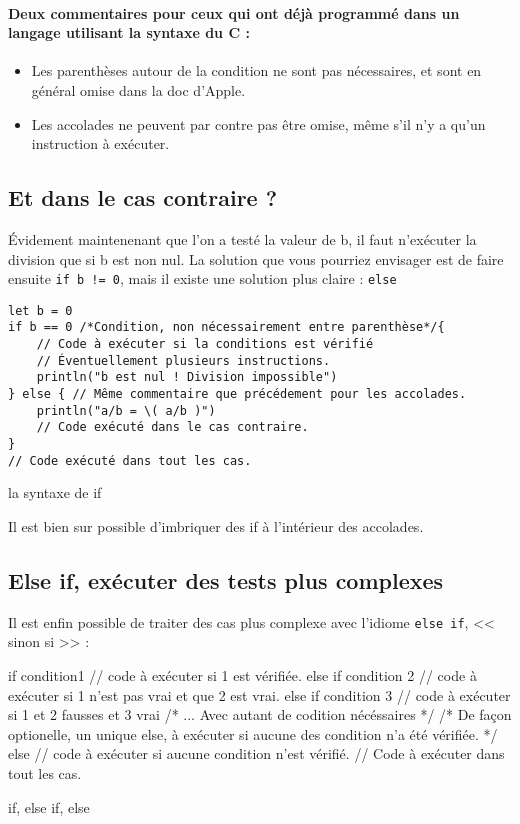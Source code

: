 \paragraph{Deux commentaires pour ceux qui ont déjà programmé
dans un langage utilisant la syntaxe du C :}
\begin{itemize}
\item Les parenthèses autour de la condition ne sont pas nécessaires,
et sont en général omise dans la doc d'Apple.
\item Les accolades ne peuvent par contre pas être omise,
même s'il n'y a qu'un instruction à exécuter.
\end{itemize}
\subsection{Et dans le cas contraire ?}
Évidement maintenenant que l'on  a testé la valeur de b, il faut n'exécuter la division que si b est non nul.
La solution que vous pourriez envisager est de faire ensuite
\texttt{if b != 0},
mais il existe une solution plus claire : \texttt{else}
\begin{listing}[h]
\begin{verbatim}
let b = 0
if b == 0 /*Condition, non nécessairement entre parenthèse*/{
    // Code à exécuter si la conditions est vérifié
    // Éventuellement plusieurs instructions.
    println("b est nul ! Division impossible")
} else { // Même commentaire que précédement pour les accolades.
    println("a/b = \( a/b )")
    // Code exécuté dans le cas contraire.
}
// Code exécuté dans tout les cas.
\end{verbatim}
\caption{la syntaxe de if}
\end{listing} %

Il est bien sur possible d'imbriquer des if à l'intérieur des accolades.
\subsection{Else if, exécuter des tests plus complexes}
Il est enfin possible de traiter des cas plus complexe avec l'idiome \texttt{else if}, << sinon si >> :
\begin{listing}[h]
if condition1 {
    // code à exécuter si 1 est vérifiée.
}
else if condition 2
{
    // code à exécuter si 1 n'est pas vrai et que 2 est vrai.
} else if condition 3 {
    // code à exécuter si 1 et 2 fausses et 3 vrai 
}
/* ... Avec autant de codition nécéssaires */
/* De façon optionelle, un unique else, à exécuter si aucune des condition n'a été vérifiée. */
else {
    // code à exécuter si aucune  condition n'est vérifié.
}
// Code à exécuter dans tout les cas.

\caption{if, else if, else}
\end{listing}
